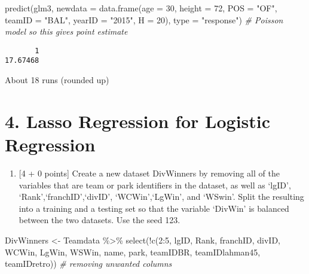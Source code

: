 \documentclass[
]{article}
\newenvironment{Shaded}{\begin{snugshade}}{\end{snugshade}}
\newcommand{\AttributeTok}[1]{\textcolor[rgb]{0.77,0.63,0.00}{#1}}
\newcommand{\CommentTok}[1]{\textcolor[rgb]{0.56,0.35,0.01}{\textit{#1}}}
\newcommand{\DecValTok}[1]{\textcolor[rgb]{0.00,0.00,0.81}{#1}}
\newcommand{\FunctionTok}[1]{\textcolor[rgb]{0.00,0.00,0.00}{#1}}
\newcommand{\NormalTok}[1]{#1}
\newcommand{\OtherTok}[1]{\textcolor[rgb]{0.56,0.35,0.01}{#1}}
\newcommand{\SpecialCharTok}[1]{\textcolor[rgb]{0.00,0.00,0.00}{#1}}
\newcommand{\StringTok}[1]{\textcolor[rgb]{0.31,0.60,0.02}{#1}}
\providecommand{\tightlist}{%
  \setlength{\itemsep}{0pt}\setlength{\parskip}{0pt}}
\begin{document}
\begin{Shaded}
\begin{Highlighting}[]
\FunctionTok{predict}\NormalTok{(glm3, }\AttributeTok{newdata =} \FunctionTok{data.frame}\NormalTok{(}\AttributeTok{age =} \DecValTok{30}\NormalTok{, }\AttributeTok{height =} \DecValTok{72}\NormalTok{, }\AttributeTok{POS =} \StringTok{"OF"}\NormalTok{, }\AttributeTok{teamID =} \StringTok{"BAL"}\NormalTok{, }\AttributeTok{yearID =} \StringTok{"2015"}\NormalTok{, }\AttributeTok{H =} \DecValTok{20}\NormalTok{), }\AttributeTok{type =} \StringTok{"response"}\NormalTok{) }\CommentTok{\# Poisson model so this gives point estimate}
\end{Highlighting}
\end{Shaded}

\begin{verbatim}
       1 
17.67468 
\end{verbatim}

About 18 runs (rounded up)

\hypertarget{lasso-regression-for-logistic-regression}{%
\section{4. Lasso Regression for Logistic
Regression}\label{lasso-regression-for-logistic-regression}}

\begin{enumerate}
\def\labelenumi{\alph{enumi}.}
\tightlist
\item
  {[}4 + 0 points{]} Create a new dataset DivWinners by removing all of
  the variables that are team or park identifiers in the dataset, as
  well as `lgID', `Rank',`franchID',`divID', `WCWin',`LgWin', and
  `WSwin'. Split the resulting into a training and a testing set so that
  the variable `DivWin' is balanced between the two datasets. Use the
  seed 123.
\end{enumerate}

\begin{Shaded}
\begin{Highlighting}[]
\NormalTok{DivWinners }\OtherTok{\textless{}{-}}\NormalTok{ Teamdata }\SpecialCharTok{\%\textgreater{}\%}
  \FunctionTok{select}\NormalTok{(}\SpecialCharTok{!}\FunctionTok{c}\NormalTok{(}\DecValTok{2}\SpecialCharTok{:}\DecValTok{5}\NormalTok{, lgID, Rank, franchID, divID, WCWin, LgWin, WSWin, name, park, teamIDBR, teamIDlahman45, teamIDretro)) }\CommentTok{\# removing unwanted columns}
\end{Highlighting}
\end{Shaded}
\end{document}
